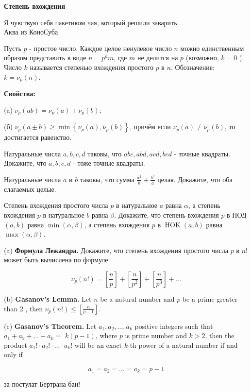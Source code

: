 \centerline{\bf \Huge Степень вхождения}

\begin{flushright}
        \scriptsize{Я чувствую себя пакетиком чая, который решили заварить\\ Аква из КоноСуба}
\end{flushright}

Пусть $p$ - простое число. Каждое целое ненулевое число $n$ можно единственным образом представить в виде $n=p^k m$, где $m$ не делится на $p$ (возможно, $k=0$ ). Число $k$ называется степенью вхождения простого $p$ в $n$. Обозначение: $k=\nu_p(n)$.

\textbf{\large Свойства:}

(a) $\nu_p(a b)=\nu_p(a)+\nu_p(b)$;

(б) $\nu_p(a \pm b) \geqslant \min \left\{\nu_p(a), \nu_p(b)\right\}$, причём если $\nu_p(a) \neq \nu_p(b)$, то достигается равенство.

Натуральные числа $a, b, c, d$ таковы, что $a b c, a b d, a c d, b c d$ - точные квадраты. Докажите, что $a, b, c, d$ - тоже точные квадраты.

Натуральные числа $a$ и $b$ таковы, что сумма $\frac{a^2}{b}+\frac{b^2}{a}$ целая. Докажите, что оба слагаемых целые.

Степень вхождения простого числа $p$ в натуральное $a$ равна $\alpha$, а степень вхождения $p$ в натуральное $b$ равна $\beta$. Докажите, что степень вхождения $p$ в НОД $(a, b)$ равна $\min (\alpha, \beta)$, а степень вхождения $p$ в $\operatorname{HOK}(a, b)$ равна $\max (\alpha, \beta)$.

(a) \textbf{Формула Лежандра.} Докажите, что степень вхождения простого числа $p$ в $n!$ может быть вычислена по формуле

$$
\nu_p(n!)=\left[\frac{n}{p}\right]+\left[\frac{n}{p^2}\right]+\left[\frac{n}{p^3}\right]+\ldots
$$

(b)
\textbf{Gasanov's Lemma.}
Let $n$ be a natural number and $p$ be a prime greater than 2 , then $\nu_p(n!) \leq\left[\frac{n}{p-1}\right]$.

(c)
\textbf{Gasanov's Theorem.}
Let $a_1, a_2, \ldots, a_k$ positive integers such that $a_1+a_2+\ldots+a_k=$ $k(p-1)$, where $p$ is prime number and $k>2$, then the product $a_{1}!\cdot a_{2}!\cdot \ldots \cdot a_{k}!$ will be an exact $k$-th power of a natural number if and only if

$$
a_1=a_2=\ldots=a_k=p-1
$$

\begin{flushright}
        \scriptsize{за постулат Бертрана бан!}
\end{flushright}

